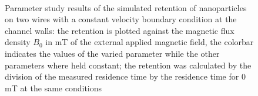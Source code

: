 \begin{figure}[H]
\begin{subfigure}{0.49\textwidth}
        \end{subfigure}
        \\       
          \caption[Parameter study results of the simulated retention of nanoparticles on two wires with a constant velocity boundary condition at the channel walls]{Parameter study results of the simulated retention of nanoparticles on two wires with a constant velocity boundary condition at the channel walls: the retention is plotted against the magnetic flux density $B_{0}$ in mT of the external applied magnetic field, the colorbar indicates the values of the varied parameter while the other parameters where held constant; the retention was calculated by the division of the measured residence time by the residence time for 0\,mT at the same conditions}
        \label{fig:tw_param_res_constBC}
  \end{figure}
        
